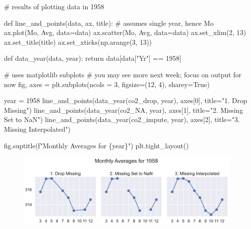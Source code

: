 \documentclass[
  letterpaper,
  DIV=11,
  numbers=noendperiod]{scrreprt}
\newenvironment{Shaded}{\begin{snugshade}}{\end{snugshade}}
\newcommand{\CommentTok}[1]{\textcolor[rgb]{0.37,0.37,0.37}{#1}}
\newcommand{\ControlFlowTok}[1]{\textcolor[rgb]{0.00,0.23,0.31}{#1}}
\newcommand{\DecValTok}[1]{\textcolor[rgb]{0.68,0.00,0.00}{#1}}
\newcommand{\KeywordTok}[1]{\textcolor[rgb]{0.00,0.23,0.31}{#1}}
\newcommand{\NormalTok}[1]{\textcolor[rgb]{0.00,0.23,0.31}{#1}}
\newcommand{\OperatorTok}[1]{\textcolor[rgb]{0.37,0.37,0.37}{#1}}
\newcommand{\SpecialCharTok}[1]{\textcolor[rgb]{0.37,0.37,0.37}{#1}}
\newcommand{\SpecialStringTok}[1]{\textcolor[rgb]{0.13,0.47,0.30}{#1}}
\newcommand{\StringTok}[1]{\textcolor[rgb]{0.13,0.47,0.30}{#1}}
\newcommand{\VariableTok}[1]{\textcolor[rgb]{0.07,0.07,0.07}{#1}}
\begin{document}
\begin{Shaded}
\begin{Highlighting}[]
\CommentTok{\# results of plotting data in 1958}

\KeywordTok{def}\NormalTok{ line\_and\_points(data, ax, title):}
    \CommentTok{\# assumes single year, hence Mo}
\NormalTok{    ax.plot(}\StringTok{\textquotesingle{}Mo\textquotesingle{}}\NormalTok{, }\StringTok{\textquotesingle{}Avg\textquotesingle{}}\NormalTok{, data}\OperatorTok{=}\NormalTok{data)}
\NormalTok{    ax.scatter(}\StringTok{\textquotesingle{}Mo\textquotesingle{}}\NormalTok{, }\StringTok{\textquotesingle{}Avg\textquotesingle{}}\NormalTok{, data}\OperatorTok{=}\NormalTok{data)}
\NormalTok{    ax.set\_xlim(}\DecValTok{2}\NormalTok{, }\DecValTok{13}\NormalTok{)}
\NormalTok{    ax.set\_title(title)}
\NormalTok{    ax.set\_xticks(np.arange(}\DecValTok{3}\NormalTok{, }\DecValTok{13}\NormalTok{))}

\KeywordTok{def}\NormalTok{ data\_year(data, year):}
    \ControlFlowTok{return}\NormalTok{ data[data[}\StringTok{"Yr"}\NormalTok{] }\OperatorTok{==} \DecValTok{1958}\NormalTok{]}
    
\CommentTok{\# uses matplotlib subplots}
\CommentTok{\# you may see more next week; focus on output for now}
\NormalTok{fig, axes }\OperatorTok{=}\NormalTok{ plt.subplots(ncols }\OperatorTok{=} \DecValTok{3}\NormalTok{, figsize}\OperatorTok{=}\NormalTok{(}\DecValTok{12}\NormalTok{, }\DecValTok{4}\NormalTok{), sharey}\OperatorTok{=}\VariableTok{True}\NormalTok{)}

\NormalTok{year }\OperatorTok{=} \DecValTok{1958}
\NormalTok{line\_and\_points(data\_year(co2\_drop, year), axes[}\DecValTok{0}\NormalTok{], title}\OperatorTok{=}\StringTok{"1. Drop Missing"}\NormalTok{)}
\NormalTok{line\_and\_points(data\_year(co2\_NA, year), axes[}\DecValTok{1}\NormalTok{], title}\OperatorTok{=}\StringTok{"2. Missing Set to NaN"}\NormalTok{)}
\NormalTok{line\_and\_points(data\_year(co2\_impute, year), axes[}\DecValTok{2}\NormalTok{], title}\OperatorTok{=}\StringTok{"3. Missing Interpolated"}\NormalTok{)}

\NormalTok{fig.suptitle(}\SpecialStringTok{f"Monthly Averages for }\SpecialCharTok{\{}\NormalTok{year}\SpecialCharTok{\}}\SpecialStringTok{"}\NormalTok{)}
\NormalTok{plt.tight\_layout()}
\end{Highlighting}
\end{Shaded}

\begin{figure}[H]

{\centering \includegraphics{eda/eda_files/figure-pdf/cell-75-output-1.pdf}

}

\end{figure}
\end{document}
